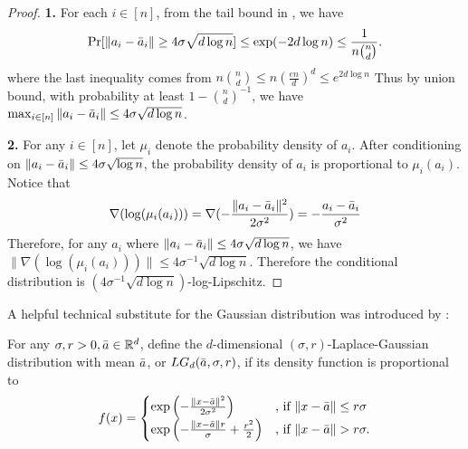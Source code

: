 \documentclass{article}\usepackage[a4paper,margin=20mm]{geometry}
\newcommand{\R}{\mathbb R}
\begin{document}
\begin{proof}
    \textbf{1.} For each $i \in [n]$, from the tail bound in , we have 
    \begin{align*}
        \Pr[\|a_i - \Bar{a}_i\| \geq 4\sigma \sqrt{d \log n}] \leq \exp(-2d \log n ) \leq \frac{1}{n \binom{n}{d}}.
    \end{align*}
    where the last inequality comes from $n\binom{n}{d} \leq n(\frac{en}{d})^d \leq e^{2d\log n}$
    Thus by union bound, with probability at least $1 - \binom{n}{d}^{-1}$, we have $\max_{i \in [n]} \|a_i - \Bar{a}_i\| \leq 4\sigma \sqrt{d \log n}$.
    
    \textbf{2.} For any $i\in [n]$, let $\mu_i$ denote the probability density of $a_i$. After conditioning on $\|a_i - \Bar{a}_i\| \leq 4\sigma \sqrt{\log n}$, the probability density of $a_i$ is proportional to $\mu_i(a_i)$. Notice that 
    \begin{align*}
        \nabla (\log (\mu_i(a_i))) = \nabla (-\frac{\|a_i - \Bar{a}_i\|^2}{2\sigma^2}) = - \frac{a_i - \Bar{a}_i}{\sigma^2}
    \end{align*}
    Therefore, for any $a_i$ where $\|a_i - \Bar{a}_i\| \leq 4\sigma \sqrt{d \log n}$, we have $\|\nabla (\log (\mu_i(a_i)))\| \leq 4\sigma^{-1} \sqrt{d \log n}$. Therefore the conditional distribution is $(4\sigma^{-1} \sqrt{d\log n})$-log-Lipschitz.
\end{proof}
\fi



A helpful technical substitute for the Gaussian distribution was introduced by \cite{DH18}:
\begin{definition}\label{def:laplace-gaussian-distribution}
    For any $\sigma, r > 0, \Bar{a} \in \R^d$, define the $d$-dimensional $(\sigma, r)$-Laplace-Gaussian distribution with mean $\Bar{a}$, or $LG_d(\Bar{a}, \sigma, r)$, if its density function is proportional to
    \begin{align}
        f(x) = \begin{cases}
        \exp\left( -\frac{\|x - \Bar{a}\|^2 }{2\sigma^2} \right) & \text{, if } \|x - \Bar{a}\| \leq r\sigma \\
        \exp\left( -\frac{\|x - \Bar{a}\| r }{\sigma} + \frac{r^2}{2} \right) & \text{, if } \|x - \Bar{a}\| > r\sigma.
        \end{cases} \label{eq:laplace-gaussian}
    \end{align}
\end{definition}
\end{document}
